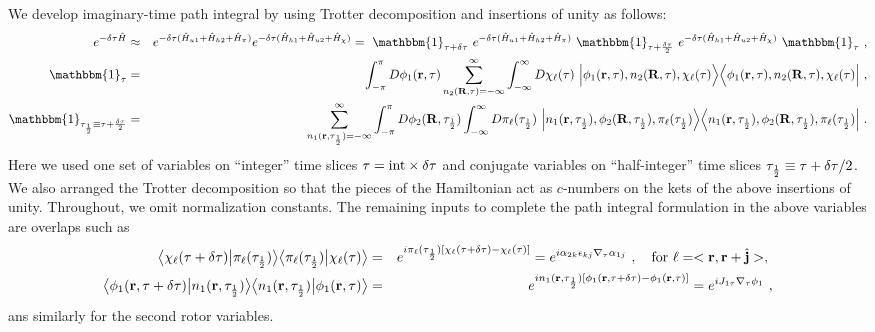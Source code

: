 We develop imaginary-time path integral by using Trotter decomposition and insertions of unity as follows:
\begin{eqnarray*}
e^{-\delta\tau \hat{H}} &\approx& e^{-\delta\tau (\hat{H}_{u1} + \hat{H}_{h2} + \hat{H}_\pi)} e^{-\delta\tau (\hat{H}_{h1} + \hat{H}_{u2} + \hat{H}_\chi)}
= ~\mathbbm{1}_{\tau + \delta\tau}~ e^{-\delta\tau (\hat{H}_{u1} + \hat{H}_{h2} + \hat{H}_\pi)} ~\mathbbm{1}_{\tau + \frac{\delta\tau}{2}}~ e^{-\delta\tau (\hat{H}_{h1} + \hat{H}_{u2} + \hat{H}_\chi)} ~\mathbbm{1}_{\tau} ~,\\
\mathbbm{1}_{\tau} &=&
\int_{-\pi}^\pi D\phi_1(\br, \tau)
\sum_{n_2(\bR, \tau) = -\infty}^\infty
\int_{-\infty}^\infty D\chi_\ell(\tau) ~
\Big|   \phi_1(\br, \tau), n_2(\bR, \tau), \chi_\ell(\tau) \Big\ra
\Big\la \phi_1(\br, \tau), n_2(\bR, \tau), \chi_\ell(\tau) \Big| ~,\\
\mathbbm{1}_{\tau_\half \equiv \tau + \frac{\delta\tau}{2}} &=&
\sum_{n_1(\br, \tau_\half) = -\infty}^\infty
\int_{-\pi}^\pi D\phi_2(\bR, \tau_\half) 
\int_{-\infty}^\infty D\pi_\ell(\tau_\half) ~
\Big|   n_1(\br, \tau_\half), \phi_2(\bR, \tau_\half), \pi_\ell(\tau_\half) \Big\ra
\Big\la n_1(\br, \tau_\half), \phi_2(\bR, \tau_\half), \pi_\ell(\tau_\half) \Big| ~.
\end{eqnarray*}
Here we used one set of variables on ``integer'' time slices $\tau = {\rm int} \times \delta\tau$ and conjugate variables on ``half-integer'' time slices $\tau_{\frac{1}{2}} \equiv \tau + \delta\tau/2$.  We also arranged the Trotter decomposition so that the pieces of the Hamiltonian act as $c$-numbers on the kets of the above insertions of unity.  Throughout, we omit normalization constants.  The remaining inputs to complete the path integral formulation in the above variables are overlaps such as
\begin{eqnarray}
\big\langle \chi_\ell(\tau + \delta\tau) \big| \pi_\ell(\tau_{\frac{1}{2}}) \big\rangle
\big\langle \pi_\ell(\tau_{\frac{1}{2}}) \big| \chi_\ell(\tau) \big\rangle &=& e^{i \pi_\ell(\tau_{\frac{1}{2}}) [\chi_\ell(\tau + \delta\tau) - \chi_\ell(\tau)]}
= e^{i \alpha_{2k} \epsilon_{kj} \nabla_\tau \alpha_{1j}} ~,
\quad {\rm for~} \ell = <{\bf r}, {\bf r}+\hat{{\bf j}}>, ~ \\
\big\langle \phi_1({\bf r}, \tau + \delta\tau) \big| n_1({\bf r}, \tau_{\frac{1}{2}}) \big\rangle
\big\langle n_1({\bf r}, \tau_{\frac{1}{2}}) \big| \phi_1({\bf r}, \tau) \big\rangle &=&
e^{i n_1({\bf r}, \tau_{\frac{1}{2}}) [\phi_1({\bf r}, \tau + \delta\tau) - \phi_1({\bf r}, \tau)]}
= e^{i J_{1\tau} \nabla_\tau \phi_1} ~,
\end{eqnarray}
ans similarly for the second rotor variables.

